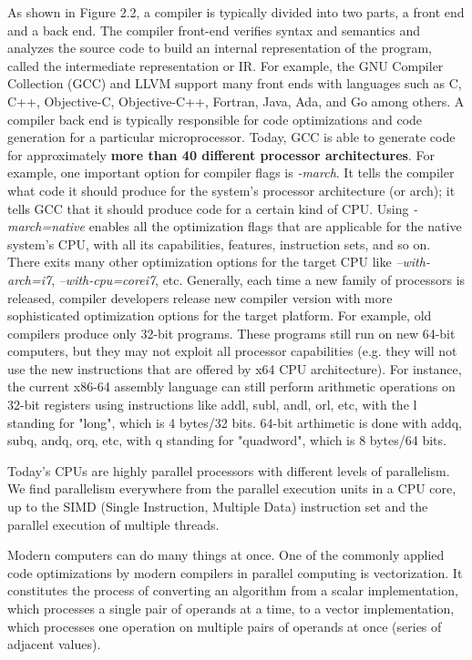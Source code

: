 As shown in Figure 2.2, a compiler is typically divided into two parts, a front end and a back end. The compiler front-end verifies syntax and semantics and analyzes the source code to build an internal representation of the program, called the intermediate representation or IR. For example, the GNU Compiler Collection (GCC) and LLVM support many front ends with languages such as C, C++, Objective-C, Objective-C++, Fortran, Java, Ada, and Go among others. 
A compiler back end is typically responsible for code optimizations and code generation for a particular microprocessor. Today, GCC is able to generate code for approximately \textbf{more than 40 different processor architectures}.
For example, one important option for compiler flags is \textit{-march}. It tells the compiler what code it should produce for the system's processor architecture (or arch); it tells GCC that it should produce code for a certain kind of CPU. Using \textit{-march=native} enables all the optimization flags that are applicable for the native system's CPU, with all its capabilities, features, instruction sets, and so on. There exits many other optimization options for the target CPU like \textit{--with-arch=i7}, \textit{--with-cpu=corei7}, etc.
Generally, each time a new family of processors is released, compiler developers release new compiler version with more sophisticated optimization options for the target platform. For example, old compilers produce only 32-bit programs. These programs still run on new 64-bit computers, but they may not exploit all processor capabilities (e.g. they will not use the new instructions that are offered by x64 CPU architecture). For instance, the current x86-64 assembly language can still perform arithmetic operations on 32-bit registers using instructions like addl, subl, andl, orl, etc, with the l standing for "long", which is 4 bytes/32 bits. 64-bit arthimetic is done with addq, subq, andq, orq, etc, with q standing for "quadword", which is 8 bytes/64 bits.


Today's CPUs are highly parallel processors with different levels of parallelism.
We find parallelism everywhere from the parallel execution units in a CPU core, up to the SIMD
(Single Instruction, Multiple Data) instruction set and the parallel execution of multiple
threads. 

Modern computers can do many things at once. One of the commonly applied code optimizations by modern compilers in parallel computing is vectorization. It constitutes the process of converting an algorithm from a scalar implementation, which processes a single pair of operands at a time, to a vector implementation, which processes one operation on multiple pairs of operands at once (series of adjacent values).

